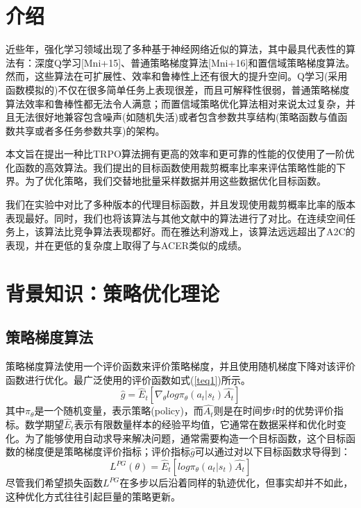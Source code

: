 \documentclass[bachelor]{thesis-uestc}
\begin{document}
	\section{介绍}
	近些年，强化学习领域出现了多种基于神经网络近似的算法，其中最具代表性的算法有：深度Q学习[Mni+15]、普通策略梯度算法[Mni+16]和置信域策略梯度算法。然而，这些算法在可扩展性、效率和鲁棒性上还有很大的提升空间。Q学习(采用函数模拟的)不仅在很多简单任务上表现很差，而且可解释性很弱，普通策略梯度算法效率和鲁棒性都无法令人满意；而置信域策略优化算法相对来说太过复杂，并且无法很好地兼容包含噪声(如随机失活)或者包含参数共享结构(策略函数与值函数共享或者多任务参数共享)的架构。
	
	本文旨在提出一种比TRPO算法拥有更高的效率和更可靠的性能的仅使用了一阶优化函数的高效算法。我们提出的目标函数使用裁剪概率比率来评估策略性能的下界。为了优化策略，我们交替地批量采样数据并用这些数据优化目标函数。
	
	我们在实验中对比了多种版本的代理目标函数，并且发现使用裁剪概率比率的版本表现最好。同时，我们也将该算法与其他文献中的算法进行了对比。在连续空间任务上，该算法比竞争算法表现都好。而在雅达利游戏上，该算法远远超出了A2C的表现，并在更低的复杂度上取得了与ACER类似的成绩。
	
	\section{背景知识：策略优化理论}
	\subsection{策略梯度算法}
	策略梯度算法使用一个评价函数来评价策略梯度，并且使用随机梯度下降对该评价函数进行优化。最广泛使用的评价函数如式(\ref{teq1})所示。
	\begin{equation}
		\label{teq1}
		\hat{g}=\hat{E}_t[\nabla_\theta log\pi_\theta(a_t|s_t)\hat{A_t}]
	\end{equation}
	其中$\pi_\theta$是一个随机变量，表示策略(policy)，而$\hat{A_t}$则是在时间步$t$时的优势评价指标。数学期望$\hat{E}_t$表示有限数量样本的经验平均值，它通常在数据采样和优化时变化。为了能够使用自动求导来解决问题，通常需要构造一个目标函数，这个目标函数的梯度便是策略梯度评价指标；评价指标$\hat{g}$可以通过对以下目标函数求导得到：
	\begin{equation}
		\label{teq2}
		L^{PG}(\theta)=\hat{E}_t[log\pi_\theta(a_t|s_t)\hat{A_t}]
	\end{equation}
	尽管我们希望损失函数$L^{PG}$在多步以后沿着同样的轨迹优化，但事实却并不如此，这种优化方式往往引起巨量的策略更新。
	
\end{document}
